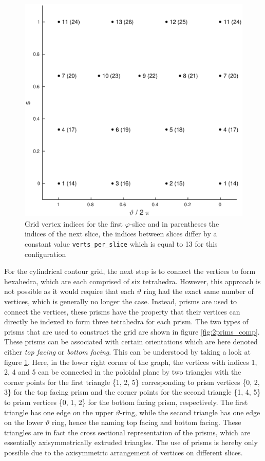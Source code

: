 \documentclass[./main.tex]{subfiles}
\begin{document}
\begin{figure}[!ht]
	\includegraphics[width=1\textwidth]{figures/vertices_2d_slices.eps}
	\caption{Grid vertex indices  for the first $\varphi$-slice and in parentheses the indices of the next slice, the indices between slices differ by a constant value \texttt{verts\_per\_slice} which is equal to 13 for this configuration}
	\label{fig:verts_slices}
\end{figure}

For the cylindrical contour grid, the next step is to connect the vertices to form hexahedra, which are each comprised of six tetrahedra. However, this approach is not possible as it would require that each $\vartheta$ ring had the exact same number of vertices, which is generally no longer the case. Instead, prisms are used to connect the vertices, these prisms have the property that their vertices can directly be indexed to form three tetrahedra for each prism. The two types of prisms that are used to construct the grid are shown in figure \ref{fig:2prims_comp}. These prisms can be associated with certain orientations which are here denoted either \textit{top facing} or \textit{bottom facing}. This can be understood by taking a look at figure \ref{fig:verts_slices}. Here, in the lower right corner of the graph, the vertices with indices 1, 2, 4 and 5 can be connected in the poloidal plane by two triangles with the corner points for the first triangle \{1, 2, 5\} corresponding to prism vertices \{0, 2, 3\} for the top facing prism and the corner points for the second triangle \{1, 4, 5\} to prism vertices \{0, 1, 2\} for the bottom facing prism, respectively. The first triangle has one edge on the upper $\vartheta$-ring, while the second triangle has one edge on the lower $\vartheta$ ring, hence the naming top facing and bottom facing. These triangles are in fact the cross sectional representation of the prisms, which are essentially axisymmetrically extruded triangles. The use of prisms is hereby only possible due to the axisymmetric arrangement of vertices on different slices. 
\end{document}
